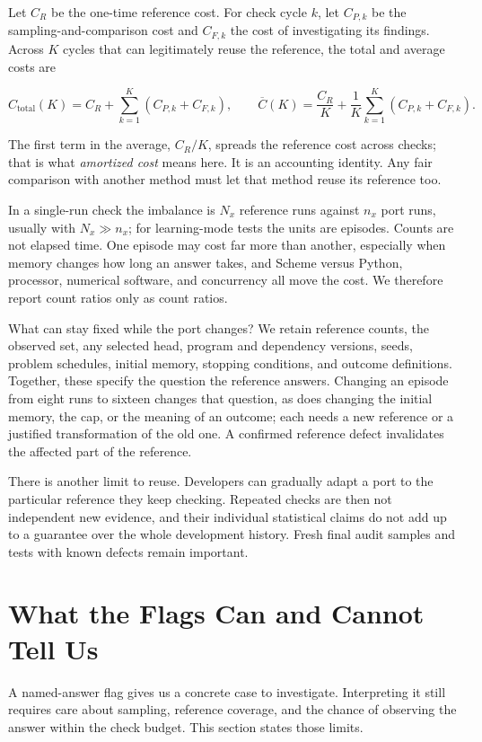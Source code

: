 \documentclass[10pt,letterpaper]{article}
\begin{document}
Let \(C_R\) be the one-time reference cost. For check cycle \(k\), let \(C_{P,k}\) be the
sampling-and-comparison cost and \(C_{F,k}\) the cost of investigating its findings.
Across \(K\) cycles that can legitimately reuse the reference, the total and average costs
are

\[
C_{\mathrm{total}}(K)=C_R+\sum_{k=1}^{K}(C_{P,k}+C_{F,k}),\qquad
\overline C(K)=\frac{C_R}{K}+\frac{1}{K}\sum_{k=1}^{K}(C_{P,k}+C_{F,k}).
\]

The first term in the average, \(C_R/K\), spreads the reference cost across checks; that
is what \emph{amortized cost} means here. It is an accounting identity. Any fair
comparison with another method must let that method reuse its reference too.

In a single-run check the imbalance is \(N_x\) reference runs against \(n_x\) port runs,
usually with \(N_x\gg n_x\); for learning-mode tests the units are episodes. Counts are
not elapsed time. One episode may cost far more than another, especially when memory
changes how long an answer takes, and Scheme versus Python, processor, numerical software,
and concurrency all move the cost. We therefore report count ratios only as count ratios.

What can stay fixed while the port changes? We retain reference counts, the observed set,
any selected head, program and dependency versions, seeds, problem schedules, initial
memory, stopping conditions, and outcome definitions. Together, these specify the question
the reference answers. Changing an episode from eight runs to sixteen changes that
question, as does changing the initial memory, the cap, or the meaning of an outcome; each
needs a new reference or a justified transformation of the old one. A confirmed reference
defect invalidates the affected part of the reference.

There is another limit to reuse. Developers can gradually adapt a port to the particular
reference they keep checking. Repeated checks are then not independent new evidence, and
their individual statistical claims do not add up to a guarantee over the whole
development history. Fresh final audit samples and tests with known defects remain
important.

\section{What the Flags Can and Cannot Tell Us}\label{sec:statistics}

A named-answer flag gives us a concrete case to investigate. Interpreting it still
requires care about sampling, reference coverage, and the chance of observing the answer
within the check budget. This section states those limits.
\end{document}
